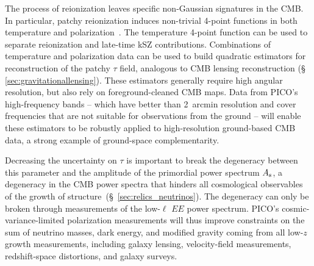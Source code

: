 \documentclass[PICOReport.tex]{subfiles}
\begin{document}
The process of reionization leaves specific non-Gaussian signatures in the CMB.  In particular, patchy reionization induces non-trivial 4-point functions in both temperature and polarization~\citep{SmithFerraro2017,DvorkinSmith2009}.  The temperature 4-point function can be used to separate reionization and late-time kSZ contributions.  Combinations of temperature and polarization data can be used to build quadratic estimators for reconstruction of the patchy $\tau$ field, analogous to CMB lensing reconstruction (\S\,\ref{sec:gravitationallensing}).  These estimators generally require high angular resolution, but also rely on foreground-cleaned CMB maps. Data from PICO's high-frequency bands -- which have better than 2~arcmin resolution and cover frequencies that are not suitable for observations from the ground -- will enable these estimators to be robustly applied to high-resolution ground-based CMB data, a strong example of ground-space complementarity.  %
%


Decreasing the uncertainty on $\tau$ is important to break the degeneracy  between this parameter and the amplitude of the primordial power spectrum $A_{\rm s}$, a degeneracy in the CMB power spectra that hinders all cosmological observables of the growth of structure~(\S~\ref{sec:relics_neutrinos}). The degeneracy can only be broken through measurements of the low-$\ell$ $EE$ power spectrum. PICO's cosmic-variance-limited polarization measurements will thus improve constraints on the sum of neutrino masses, dark energy, and modified gravity coming from all low-$z$ growth measurements, including galaxy lensing, velocity-field measurements, redshift-space distortions, and galaxy surveys.
\end{document}
